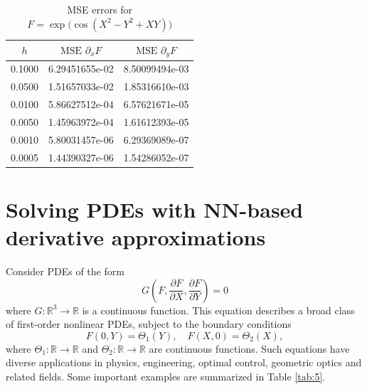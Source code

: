 \documentclass[pdflatex,sn-mathphys-num]{sn-jnl}%
\theoremstyle{thmstyleone}%
\theoremstyle{thmstyletwo}%
\theoremstyle{thmstylethree}%
\begin{document}
{\begin{table}[htbp]
\centering
\caption{MSE errors for $F=\exp\big(\cos(X^2-Y^2+XY)\big)$}
\label{Tab:4}
\begin{tabular}{ccc}
$h$ & $\text{MSE } \partial_x F$ & $\text{MSE } \partial_y F$ \\
\hline
0.1000 & 6.29451655e-02 & 8.50099494e-03 \\
0.0500 & 1.51657033e-02 & 1.85316610e-03 \\
0.0100 & 5.86627512e-04 & 6.57621671e-05 \\
0.0050 & 1.45963972e-04 & 1.61612393e-05 \\
0.0010 & 5.80031457e-06 & 6.29369089e-07 \\
0.0005 & 1.44390327e-06 & 1.54286052e-07 \\
\end{tabular}
\end{table}




\section{Solving PDEs with NN-based derivative approximations}\label{sec:pde2d}

Consider PDEs of the form
\begin{equation}
G\left(F,\frac{\partial F}{\partial X},\frac{\partial F}{\partial Y}\right)=0
\end{equation}
where $G:\mathbb{R}^3 \rightarrow \mathbb{R}$ is a continuous function. This equation describes a broad class of first-order nonlinear PDEs, subject to the boundary conditions
\[F(0,Y)=\Theta_1(Y),\quad F(X,0)=\Theta_2(X),\]
where $\Theta_1:\mathbb{R} \rightarrow \mathbb{R}$ and $\Theta_2:\mathbb{R} \rightarrow \mathbb{R}$ are continuous functions. Such equations have diverse applications in physics, engineering, optimal control, geometric optics and related fields. Some important examples are summarized in Table \ref{tab:5}.

}
\end{document}
